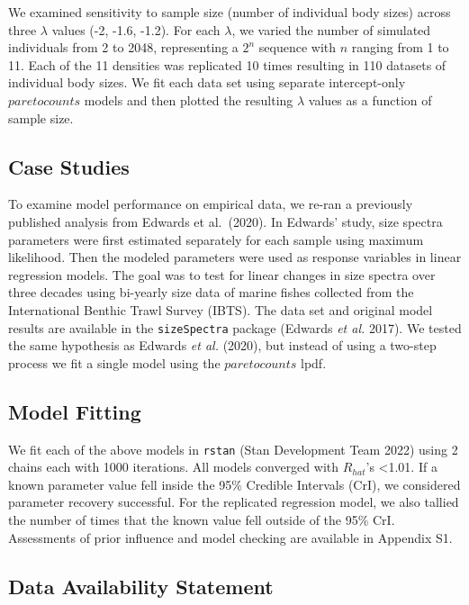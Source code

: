 \documentclass[
  12pt,
]{article}
\begin{document}
We examined sensitivity to sample size (number of individual body sizes)
across three \(\lambda\) values (-2, -1.6, -1.2). For each \(\lambda\),
we varied the number of simulated individuals from 2 to 2048,
representing a \(2^n\) sequence with \(n\) ranging from 1 to 11. Each of
the 11 densities was replicated 10 times resulting in 110 datasets of
individual body sizes. We fit each data set using separate
intercept-only \(paretocounts\) models and then plotted the resulting
\(\lambda\) values as a function of sample size.

\hypertarget{case-studies}{%
\subsection{Case Studies}\label{case-studies}}

To examine model performance on empirical data, we re-ran a previously
published analysis from Edwards et al.~(2020). In Edwards' study, size
spectra parameters were first estimated separately for each sample using
maximum likelihood. Then the modeled parameters were used as response
variables in linear regression models. The goal was to test for linear
changes in size spectra over three decades using bi-yearly size data of
marine fishes collected from the International Benthic Trawl Survey
(IBTS). The data set and original model results are available in the
\texttt{sizeSpectra} package (Edwards \emph{et al.} 2017). We tested the
same hypothesis as Edwards \emph{et al.} (2020), but instead of using a
two-step process we fit a single model using the \(paretocounts\) lpdf.

\hypertarget{model-fitting}{%
\subsection{Model Fitting}\label{model-fitting}}

We fit each of the above models in \texttt{rstan} (Stan Development Team
2022) using 2 chains each with 1000 iterations. All models converged
with \(R_{hat}\)'s \textless1.01. If a known parameter value fell inside
the 95\% Credible Intervals (CrI), we considered parameter recovery
successful. For the replicated regression model, we also tallied the
number of times that the known value fell outside of the 95\% CrI.
Assessments of prior influence and model checking are available in
Appendix S1.

\hypertarget{data-availability-statement}{%
\subsection{Data Availability
Statement}\label{data-availability-statement}}
\end{document}
